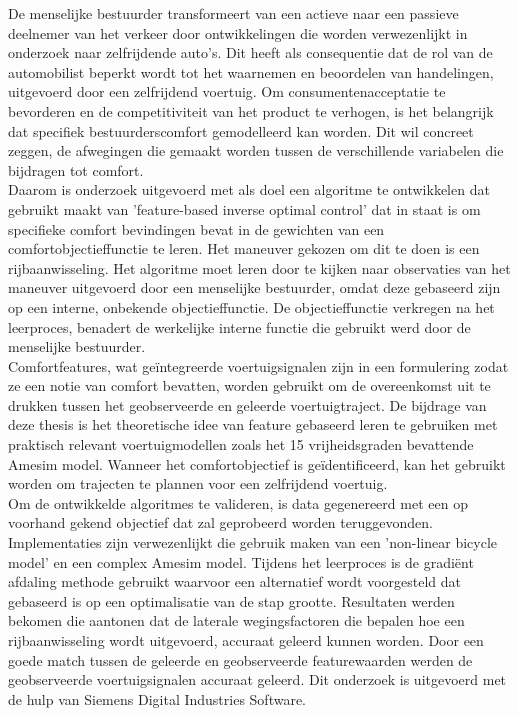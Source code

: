 \documentclass[master=wtk,english]{kulemt}
\begin{document}
\begin{abstract*}
De menselijke bestuurder transformeert van een actieve naar een passieve deelnemer van het verkeer door ontwikkelingen die worden verwezenlijkt in onderzoek naar zelfrijdende auto's.  Dit heeft als consequentie dat de rol van de automobilist beperkt wordt tot het waarnemen en beoordelen van handelingen, uitgevoerd door een zelfrijdend voertuig.  Om consumentenacceptatie te bevorderen en de competitiviteit van het product te verhogen, is het belangrijk dat specifiek bestuurderscomfort gemodelleerd kan worden. Dit wil concreet zeggen, de afwegingen die gemaakt worden tussen de verschillende variabelen die bijdragen tot comfort.\\

Daarom is onderzoek uitgevoerd met als doel een algoritme te ontwikkelen dat gebruikt maakt van 'feature-based inverse optimal control' dat in staat is om specifieke comfort bevindingen bevat in de gewichten van een comfortobjectieffunctie te leren. Het maneuver gekozen om dit te doen is een rijbaanwisseling. Het algoritme moet leren door te kijken naar observaties van het maneuver uitgevoerd door een menselijke bestuurder, omdat deze gebaseerd zijn op een interne, onbekende objectieffunctie. De objectieffunctie verkregen na het leerproces, benadert de werkelijke interne functie die gebruikt werd door de menselijke bestuurder.\\ Comfortfeatures, wat ge{\"i}ntegreerde voertuigsignalen zijn in een formulering zodat ze een notie van comfort bevatten, worden gebruikt om de overeenkomst uit te drukken tussen het geobserveerde en geleerde voertuigtraject. De bijdrage van deze thesis is het theoretische idee van feature gebaseerd leren te gebruiken met praktisch relevant voertuigmodellen zoals het 15 vrijheidsgraden bevattende Amesim model. Wanneer het comfortobjectief is ge{\"i}dentificeerd, kan het gebruikt worden om trajecten te plannen voor een zelfrijdend voertuig.\\

Om de ontwikkelde algoritmes te valideren, is data gegenereerd met een op voorhand gekend objectief dat zal geprobeerd worden teruggevonden. Implementaties zijn verwezenlijkt die gebruik maken van een 'non-linear bicycle model' en een complex Amesim model. Tijdens het leerproces is de gradi{\"e}nt afdaling methode gebruikt waarvoor een alternatief wordt voorgesteld dat gebaseerd is op een optimalisatie van de stap grootte.
Resultaten werden bekomen die aantonen dat de laterale wegingsfactoren die bepalen hoe een rijbaanwisseling wordt uitgevoerd, accuraat geleerd kunnen worden. Door een goede match tussen de geleerde en geobserveerde featurewaarden werden de geobserveerde voertuigsignalen accuraat geleerd. Dit onderzoek is uitgevoerd met de hulp van Siemens Digital Industries Software.  



  

\end{abstract*}
\end{document}
